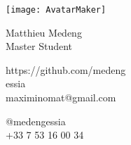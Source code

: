 \documentclass{article}
\begin{document}
\centering \texttt{[image: AvatarMaker]}\\[3pt]
\parbox{2in}{\Large \centering Matthieu Medeng\\[1pt]
\normalsize Master Student}

\vfill
\raggedright
\begin{multicols}{2}
https://github.com/medeng\\
essia\\
maximinomat@gmail.com

\columnbreak
\raggedleft
@medengessia\\
+33 7 53 16 00 34%
\end{multicols}%
\end{document}
